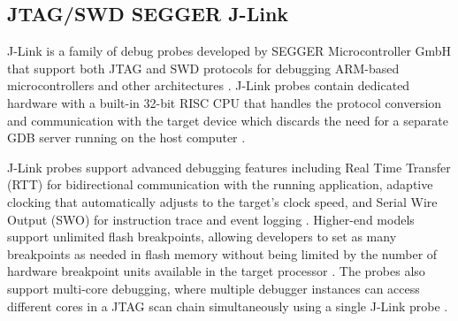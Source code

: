 

\subsection{JTAG/SWD SEGGER J-Link}

J-Link is a family of debug probes developed by SEGGER Microcontroller GmbH that support both JTAG and SWD protocols for debugging ARM-based microcontrollers and other architectures \cite{jlink}. J-Link probes contain dedicated hardware with a built-in 32-bit RISC CPU that handles the protocol conversion and communication with the target device which discards the need for a separate GDB server running on the host computer \cite{jlink}.

J-Link probes support advanced debugging features including Real Time Transfer (RTT) for bidirectional communication with the running application, adaptive clocking that automatically adjusts to the target's clock speed, and Serial Wire Output (SWO) for instruction trace and event logging \cite{jlink}. Higher-end models support unlimited flash breakpoints, allowing developers to set as many breakpoints as needed in flash memory without being limited by the number of hardware breakpoint units available in the target processor \cite{jlink}. The probes also support multi-core debugging, where multiple debugger instances can access different cores in a JTAG scan chain simultaneously using a single J-Link probe \cite{jlink}.

